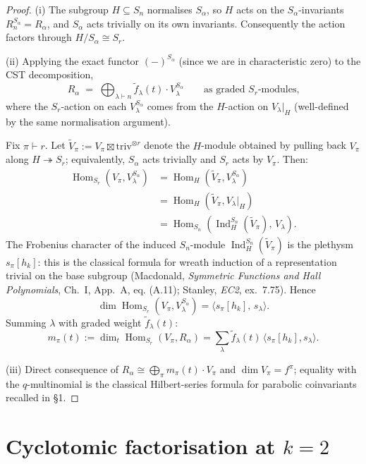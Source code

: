 \documentclass[11pt]{article}
\theoremstyle{definition}
\theoremstyle{remark}
\newcommand{\Ind}{\operatorname{Ind}}
\newcommand{\Hom}{\operatorname{Hom}}
\newcommand{\triv}{\mathrm{triv}}
\newcommand{\fdeg}{\widetilde{f}}
\begin{document}
\begin{proof}
(i) The subgroup $H \subseteq S_n$ normalises $S_\alpha$, so
$H$ acts on the $S_\alpha$-invariants $R_n^{S_\alpha} = R_\alpha$, and
$S_\alpha$ acts trivially on its own invariants. Consequently the
action factors through $H/S_\alpha \cong S_r$.

\medskip

(ii) Applying the exact functor $(-)^{S_\alpha}$ (since we are in
characteristic zero) to the CST decomposition,
\[
R_\alpha \;=\; \bigoplus_{\lambda \vdash n} \fdeg_\lambda(t) \cdot
V_\lambda^{S_\alpha}
\qquad \text{as graded $S_r$-modules,}
\]
where the $S_r$-action on each $V_\lambda^{S_\alpha}$ comes from the
$H$-action on $V_\lambda|_H$ (well-defined by the same normalisation
argument).

Fix $\pi \vdash r$. Let $\widetilde{V}_\pi := V_\pi \boxtimes \triv^{\otimes r}$
denote the $H$-module obtained by pulling back $V_\pi$ along
$H \twoheadrightarrow S_r$; equivalently, $S_\alpha$ acts trivially and
$S_r$ acts by $V_\pi$. Then:
\begin{align*}
\Hom_{S_r}(V_\pi, V_\lambda^{S_\alpha})
&= \Hom_H(\widetilde{V}_\pi, V_\lambda^{S_\alpha}) \tag{$S_\alpha$ trivial on both}\\
&= \Hom_H(\widetilde{V}_\pi, V_\lambda|_H) \tag{image is $S_\alpha$-fixed}\\
&= \Hom_{S_n}(\Ind_H^{S_n}(\widetilde{V}_\pi),\, V_\lambda). \tag{Frobenius reciprocity}
\end{align*}
The Frobenius character of the induced $S_n$-module
$\Ind_H^{S_n}(\widetilde{V}_\pi)$ is the plethysm $s_\pi[h_k]$: this is
the classical formula for wreath induction of a representation trivial
on the base subgroup (Macdonald, \emph{Symmetric Functions and Hall
Polynomials}, Ch.~I, App.~A, eq. (A.11); Stanley, \emph{EC2}, ex.~7.75).
Hence
\[
\dim \Hom_{S_r}(V_\pi, V_\lambda^{S_\alpha})
= \langle s_\pi[h_k],\, s_\lambda \rangle.
\]
Summing $\lambda$ with graded weight $\fdeg_\lambda(t)$:
\[
m_\pi(t) := \dim_t \Hom_{S_r}(V_\pi, R_\alpha)
= \sum_\lambda \fdeg_\lambda(t) \, \langle s_\pi[h_k], s_\lambda\rangle.
\]

\medskip

(iii) Direct consequence of $R_\alpha \cong \bigoplus_\pi m_\pi(t) \cdot V_\pi$
and $\dim V_\pi = f^\pi$; equality with the $q$-multinomial is the
classical Hilbert-series formula for parabolic coinvariants recalled in
\S 1.
\end{proof}

\section{Cyclotomic factorisation at $k = 2$}
\end{document}
